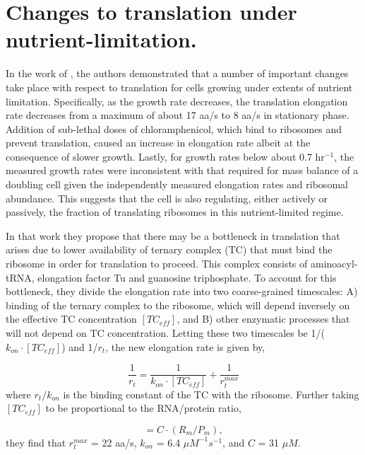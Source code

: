 \section{Changes to translation under nutrient-limitation.}

In the work of \cite{dai2016}, the authors demonstrated that a number of important
changes take place with respect to translation for cells growing under extents of
nutrient limitation. Specifically, as the growth rate decreases, the translation
elongation rate decreases from a maximum of about 17 aa/s to 8 aa/s in
stationary phase. Addition of sub-lethal doses of chloramphenicol, which bind
to ribosomes and prevent translation, caused an increase in
elongation rate albeit at the consequence of slower growth. Lastly,  for growth
rates below about 0.7 hr$^{-1}$, the measured growth rates were inconsistent
with that required for mass balance of a doubling cell given the independently
measured elongation rates and ribosomal abundance. This suggests that the cell
is also regulating, either actively or passively, the fraction of translating
ribosomes in this nutrient-limited regime.

In that work they propose that there may be a bottleneck in
translation that arises due to lower  availability of ternary complex (TC)
that must bind the ribosome in order for translation to proceed. This complex
consists of aminoacyl-tRNA, elongation factor Tu and guanosine triphosphate.
To account for this bottleneck, they divide the elongation rate into two
coarse-grained timescales: A) binding of the ternary complex to the ribosome,
which will depend inversely on the effective TC concentration $[TC_{eff}]$, and
B) other enzymatic processes that will not depend
on TC concentration. Letting these two timescales be 1/($k_{on} \cdot
[TC_{eff}]$) and 1/$r_t$, the new elongation rate is given by,

\begin{equation}
\frac{1}{r_t} = \frac{1}{k_{on} \cdot [TC_{eff}]} + \frac{1}{r_t^{max}}
\label{eq:rate_dai}
\end{equation}
where $r_t/k_{on}$ is the binding constant of the TC with the ribosome. Further
taking $[TC_{eff}]$ to be proportional to the RNA/protein ratio,

\begin{equation}
[TC_{eff}] = C \cdot (R_m/P_m),
\label{eq:elong_rate}
\end{equation}
they find that  $r_t^{max}$ = 22 aa/s, $k_{on}$ = 6.4 $\mu M^{-1}s^{-1}$, and
$C$ = 31 $\mu M$.

